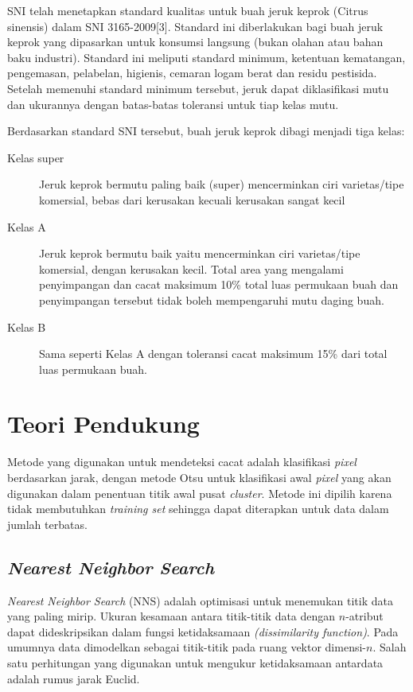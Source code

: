 \documentclass[laporan.tex]{subfiles}
\begin{document}
SNI telah menetapkan standard kualitas untuk buah jeruk keprok (Citrus sinensis) dalam SNI 3165-2009[3]. Standard ini diberlakukan bagi buah jeruk keprok yang dipasarkan untuk konsumsi langsung (bukan olahan atau bahan baku industri). Standard ini meliputi standard minimum, ketentuan kematangan, pengemasan, pelabelan, higienis, cemaran logam berat dan residu pestisida. Setelah memenuhi standard minimum tersebut, jeruk dapat diklasifikasi mutu dan ukurannya dengan batas-batas toleransi untuk tiap kelas mutu.\cite{sni}

Berdasarkan standard SNI tersebut, buah jeruk keprok dibagi menjadi tiga kelas:

\begin{description}
\item [Kelas super] Jeruk keprok bermutu paling baik (super) mencerminkan ciri varietas/tipe komersial, bebas dari kerusakan kecuali kerusakan sangat kecil
\item [Kelas A] Jeruk keprok bermutu baik yaitu mencerminkan ciri varietas/tipe komersial, dengan kerusakan kecil. Total area yang mengalami penyimpangan dan cacat maksimum 10\% total luas permukaan buah dan penyimpangan tersebut tidak boleh mempengaruhi mutu daging buah.
\item [Kelas B] Sama seperti Kelas A dengan toleransi cacat maksimum 15\% dari total luas permukaan buah.
\end{description}

\section{Teori Pendukung}

Metode yang digunakan untuk mendeteksi cacat adalah klasifikasi \emph{pixel} berdasarkan jarak, dengan metode Otsu untuk klasifikasi awal \emph{pixel} yang akan digunakan dalam penentuan titik awal pusat \emph{cluster}. Metode ini dipilih karena tidak membutuhkan \emph{training set} sehingga dapat diterapkan untuk data dalam jumlah terbatas.

\subsection{\emph{Nearest Neighbor Search}}

\emph{Nearest Neighbor Search} (NNS) adalah optimisasi untuk menemukan titik data yang paling mirip. Ukuran kesamaan antara titik-titik data dengan $n$-atribut dapat dideskripsikan dalam fungsi ketidaksamaan \emph{(dissimilarity function)}.\cite{knuth} Pada umumnya data dimodelkan sebagai titik-titik pada ruang vektor dimensi-$n$. Salah satu perhitungan yang digunakan untuk mengukur ketidaksamaan antardata adalah rumus jarak Euclid.
\end{document}
